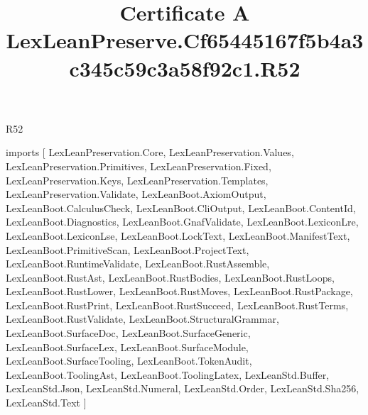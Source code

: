 \begin{lexlean}{R52}
\title{Certificate A LexLeanPreserve.Cf65445167f5b4a3c345c59c3a58f92c1.R52}
\begin{coremodule}
imports [
  LexLeanPreservation.Core,
  LexLeanPreservation.Values,
  LexLeanPreservation.Primitives,
  LexLeanPreservation.Fixed,
  LexLeanPreservation.Keys,
  LexLeanPreservation.Templates,
  LexLeanPreservation.Validate,
  LexLeanBoot.AxiomOutput,
  LexLeanBoot.CalculusCheck,
  LexLeanBoot.CliOutput,
  LexLeanBoot.ContentId,
  LexLeanBoot.Diagnostics,
  LexLeanBoot.GnafValidate,
  LexLeanBoot.LexiconLre,
  LexLeanBoot.LexiconLse,
  LexLeanBoot.LockText,
  LexLeanBoot.ManifestText,
  LexLeanBoot.PrimitiveScan,
  LexLeanBoot.ProjectText,
  LexLeanBoot.RuntimeValidate,
  LexLeanBoot.RustAssemble,
  LexLeanBoot.RustAst,
  LexLeanBoot.RustBodies,
  LexLeanBoot.RustLoops,
  LexLeanBoot.RustLower,
  LexLeanBoot.RustMoves,
  LexLeanBoot.RustPackage,
  LexLeanBoot.RustPrint,
  LexLeanBoot.RustSucceed,
  LexLeanBoot.RustTerms,
  LexLeanBoot.RustValidate,
  LexLeanBoot.StructuralGrammar,
  LexLeanBoot.SurfaceDoc,
  LexLeanBoot.SurfaceGeneric,
  LexLeanBoot.SurfaceLex,
  LexLeanBoot.SurfaceModule,
  LexLeanBoot.SurfaceTooling,
  LexLeanBoot.TokenAudit,
  LexLeanBoot.ToolingAst,
  LexLeanBoot.ToolingLatex,
  LexLeanStd.Buffer,
  LexLeanStd.Json,
  LexLeanStd.Numeral,
  LexLeanStd.Order,
  LexLeanStd.Sha256,
  LexLeanStd.Text
]


\end{coremodule}
\end{lexlean}
